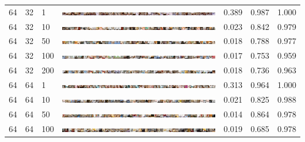 \documentclass[a4paper]{article}
\begin{document}
\begin{table}[h!]
\begin{center}
{\begin{tabular}{lllcccc}
      \hline
      64 & 32 & 1   & \includegraphics[width=\textwidth,trim={1536px 0 0 0},clip]{figures/bedrooms_g64_d32_ep1_generator.jpg}    & 0.389 & 0.987 & 1.000\\
      64 & 32 & 10  & \includegraphics[width=\textwidth,trim={1536px 0 0 0},clip]{figures/bedrooms_g64_d32_ep10_generator.jpg}   & 0.023 & 0.842 & 0.979\\
      64 & 32 & 50  & \includegraphics[width=\textwidth,trim={1536px 0 0 0},clip]{figures/bedrooms_g64_d32_ep50_generator.jpg}   & 0.018 & 0.788 & 0.977\\
      64 & 32 & 100 & \includegraphics[width=\textwidth,trim={1536px 0 0 0},clip]{figures/bedrooms_g64_d32_ep100_generator.jpg}  & 0.017 & 0.753 & 0.959\\
      64 & 32 & 200 & \includegraphics[width=\textwidth,trim={1536px 0 0 0},clip]{figures/bedrooms_g64_d32_ep200_generator.jpg}  & 0.018 & 0.736 & 0.963\\
      \hline
      64 & 64 & 1   & \includegraphics[width=\textwidth,trim={1536px 0 0 0},clip]{figures/bedrooms_g64_d64_ep1_generator.jpg}    & 0.313 & 0.964 & 1.000\\
      64 & 64 & 10  & \includegraphics[width=\textwidth,trim={1536px 0 0 0},clip]{figures/bedrooms_g64_d64_ep10_generator.jpg}   & 0.021 & 0.825 & 0.988\\
      64 & 64 & 50  & \includegraphics[width=\textwidth,trim={1536px 0 0 0},clip]{figures/bedrooms_g64_d64_ep50_generator.jpg}   & 0.014 & 0.864 & 0.978\\
      64 & 64 & 100 & \includegraphics[width=\textwidth,trim={1536px 0 0 0},clip]{figures/bedrooms_g64_d64_ep100_generator.jpg}  & 0.019 & 0.685 & 0.978\\

\end{tabular}}
\end{center}
\end{table}
\end{document}

